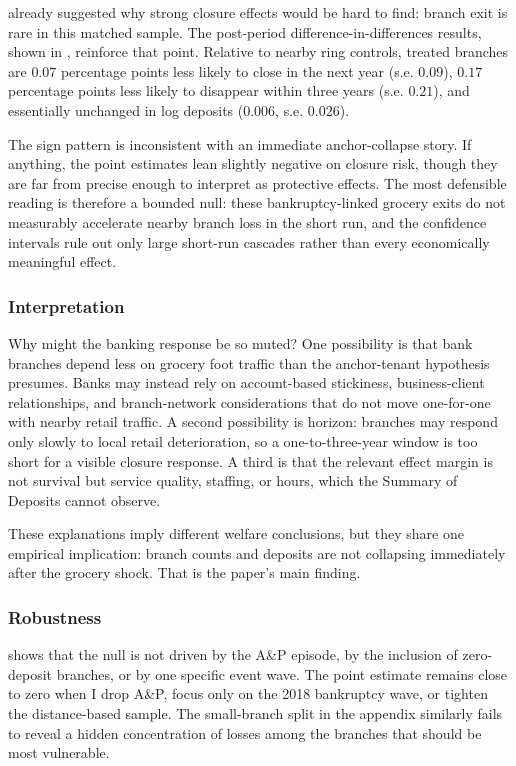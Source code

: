 \documentclass[12pt]{article}
\begin{document}


 already suggested why strong closure effects would be hard to find: branch exit is rare in this matched sample. The post-period difference-in-differences results, shown in , reinforce that point. Relative to nearby ring controls, treated branches are \(0.07\) percentage points less likely to close in the next year (s.e. \(0.09\)), \(0.17\) percentage points less likely to disappear within three years (s.e. \(0.21\)), and essentially unchanged in log deposits (\(0.006\), s.e. \(0.026\)).



The sign pattern is inconsistent with an immediate anchor-collapse story. If anything, the point estimates lean slightly negative on closure risk, though they are far from precise enough to interpret as protective effects. The most defensible reading is therefore a bounded null: these bankruptcy-linked grocery exits do not measurably accelerate nearby branch loss in the short run, and the confidence intervals rule out only large short-run cascades rather than every economically meaningful effect.

\subsubsection*{Interpretation}
Why might the banking response be so muted? One possibility is that bank branches depend less on grocery foot traffic than the anchor-tenant hypothesis presumes. Banks may instead rely on account-based stickiness, business-client relationships, and branch-network considerations that do not move one-for-one with nearby retail traffic. A second possibility is horizon: branches may respond only slowly to local retail deterioration, so a one-to-three-year window is too short for a visible closure response. A third is that the relevant effect margin is not survival but service quality, staffing, or hours, which the Summary of Deposits cannot observe.

These explanations imply different welfare conclusions, but they share one empirical implication: branch counts and deposits are not collapsing immediately after the grocery shock. That is the paper's main finding.

\subsubsection*{Robustness}
 shows that the null is not driven by the A\&P episode, by the inclusion of zero-deposit branches, or by one specific event wave. The point estimate remains close to zero when I drop A\&P, focus only on the 2018 bankruptcy wave, or tighten the distance-based sample. The small-branch split in the appendix similarly fails to reveal a hidden concentration of losses among the branches that should be most vulnerable.
\end{document}
